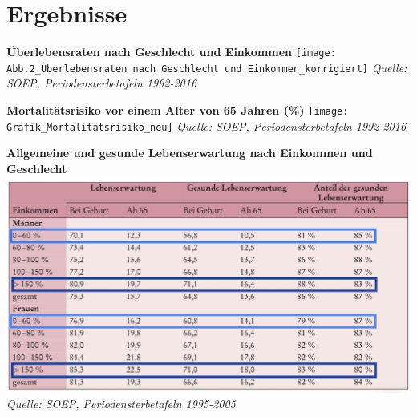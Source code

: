 \documentclass{beamer}
\begin{document}
\section{Ergebnisse}
\begin{frame}
\textbf{Überlebensraten nach Geschlecht und Einkommen}
	\texttt{[image: Abb.2\_Überlebensraten nach Geschlecht und Einkommen\_korrigiert]}
	\emph{Quelle: SOEP, Periodensterbetafeln 1992-2016}
\end{frame}

\begin{frame}
\textbf{Mortalitätsrisiko vor einem Alter von 65 Jahren (\%) }
	\texttt{[image: Grafik\_Mortalitätsrisiko\_neu]}
	\emph{Quelle: SOEP, Periodensterbetafeln 1992-2016}
\end{frame}

\begin{frame}
  \textbf{Allgemeine und gesunde Lebenserwartung nach Einkommen und Geschlecht}
	\includegraphics[scale=0.15]{Tabelle_allgemeine_und_gesunde_Lebenserwartung_neu}
	\emph{Quelle: SOEP, Periodensterbetafeln 1995-2005}
\end{frame}
 
 
\end{document}
